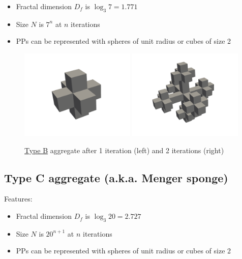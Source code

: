 \documentclass{article}
\begin{document}
\begin{itemize}
	\item Fractal dimension $D_f$ is $\log_{3}{7}=1.771$
	\item Size $N$ is $7^{n}$ at $n$ iterations
	\item PPs can be represented with spheres of unit radius or cubes of size 2
\end{itemize}

\begin{figure}[htp]
\includegraphics[width=0.49\textwidth]{resources/type-b-img-1.png}
\includegraphics[width=0.49\textwidth]{resources/type-b-img-2.png}
\caption*{\underline{Type B} aggregate after 1 iteration (left) and 2 iterations (right)}
\end{figure}

\subsection*{Type C aggregate (a.k.a. Menger sponge)}

Features:

\begin{itemize}
	\item Fractal dimension $D_f$ is $\log_{3}{20}=2.727$
	\item Size $N$ is $20^{n+1}$ at $n$ iterations
	\item PPs can be represented with spheres of unit radius or cubes of size 2
\end{itemize}
\end{document}
